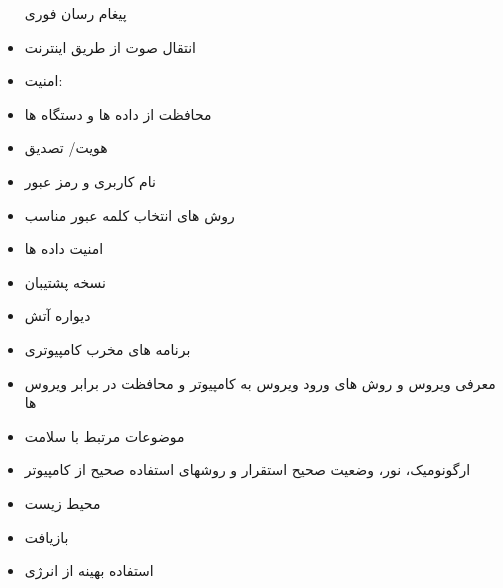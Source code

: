 \begin{itemize}
پیغام رسان فوری
\item
انتقال صوت از طریق اینترنت
\item
امنیت:
\item
محافظت از داده ها و دستگاه ها
\item
هویت/ تصدیق
\item
نام کاربری و رمز عبور
\item
روش های انتخاب کلمه عبور مناسب
\item
امنیت داده ها
\item
نسخه پشتیبان
\item
دیواره آتش
\item
برنامه های مخرب کامپیوتری
\item
معرفی ویروس و روش های ورود ویروس به کامپیوتر و محافظت در برابر ویروس ها
\item
موضوعات مرتبط با سلامت
\item
ارگونومیک، نور، وضعیت صحیح استقرار و روشهای استفاده صحیح از کامپیوتر
\item
محیط زیست
\item
بازیافت
\item
استفاده بهینه از انرژی

\end{itemize}